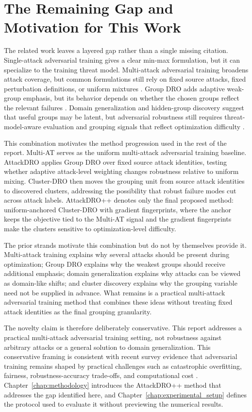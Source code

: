 \section{The Remaining Gap and Motivation for This Work}

The related work leaves a layered gap rather than a single missing citation.
Single-attack adversarial training gives a clear min-max formulation, but it
can specialize to the training threat model. Multi-attack adversarial training
broadens attack coverage, but common formulations still rely on fixed source
attacks, fixed perturbation definitions, or uniform mixtures
\cite{madry2019towards,tramer2019adversarial,maini2020adversarial}. Group DRO
adds adaptive weak-group emphasis, but its behavior depends on whether the
chosen groups reflect the relevant failures \cite{sagawa2019groupdro}. Domain
generalization and hidden-group discovery suggest that useful groups may be
latent, but adversarial robustness still requires threat-model-aware evaluation
and grouping signals that reflect optimization difficulty
\cite{gulrajani2021domainbed,sohoni2020no,creager2021environment}.

This combination motivates the method progression used in the rest of the
report. Multi-AT serves as the uniform multi-attack adversarial training
baseline. AttackDRO applies Group DRO over fixed source attack identities,
testing whether adaptive attack-level weighting changes robustness relative to
uniform mixing.
Cluster-DRO then moves the grouping unit from source attack identities to
discovered clusters, addressing the possibility that robust failure modes cut
across attack labels. AttackDRO++ denotes only the final proposed method:
uniform-anchored Cluster-DRO with gradient fingerprints, where the anchor keeps
the objective tied to the Multi-AT signal and the gradient fingerprints make
the clusters sensitive to optimization-level difficulty.

The prior strands motivate this combination but do not by themselves provide
it. Multi-attack training explains why several attacks should be present during
optimization; Group DRO explains why the weakest groups should receive
additional emphasis; domain generalization explains why attacks can be viewed
as domain-like shifts; and cluster discovery explains why the grouping variable
need not be supplied in advance. What remains is a practical multi-attack
adversarial training method that combines these ideas without treating fixed
attack identities as the final grouping granularity.

The novelty claim is therefore deliberately conservative. This report addresses
a practical multi-attack adversarial training setting, not robustness against
arbitrary attacks or a general solution to domain generalization. This
conservative framing is consistent with recent survey evidence that
adversarial training remains shaped by practical challenges such as
catastrophic overfitting, fairness, robustness-accuracy trade-offs, and
computational cost \cite{zhao2024adversarialtraining}. Chapter~\ref{chap:methodology}
introduces the AttackDRO++ method that addresses the gap identified here, and
Chapter~\ref{chap:experimental_setup} defines the protocol used to evaluate it
without previewing the numerical results.
